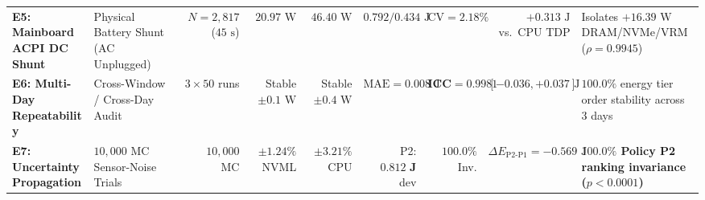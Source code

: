\documentclass[10pt,a4paper]{article}
\begin{document}
\begin{table}[htbp]
\begin{tabular}{@{}llrrrrrrl@{}}
\textbf{E5: Mainboard ACPI DC Shunt} & Physical Battery Shunt (AC Unplugged) & $N=2{,}817$ ($45\text{ s}$) & $20.97\text{ W}$ & $46.40\text{ W}$ & $0.792 / 0.434\text{ J}$ & $\text{CV}=2.18\%$ & $+0.313\text{ J}$ vs.\ CPU TDP & Isolates $+16.39\text{ W}$ DRAM/NVMe/VRM ($\rho=0.9945$) \\
\textbf{E6: Multi-Day Repeatability} & Cross-Window / Cross-Day Audit & $3\times 50$ runs & Stable $\pm 0.1\text{ W}$ & Stable $\pm 0.4\text{ W}$ & $\text{MAE}=0.008\text{ J}$ & $\mathbf{\text{ICC}=0.9981}$ & $[-0.036,+0.037]\text{ J}$ & $100.0\%$ energy tier order stability across 3 days \\
\textbf{E7: Uncertainty Propagation} & $10{,}000$ MC Sensor-Noise Trials & $10{,}000$ MC & $\pm 1.24\%$ NVML & $\pm 3.21\%$ CPU & P2: $\mathbf{0.812\text{ J}}$ dev & $\mathbf{100.0\%}$ Inv. & $\Delta E_{\text{P2-P1}}=-0.569\text{ J}$ & \textbf{$\mathbf{100.0\%}$ Policy P2 ranking invariance ($p<0.0001$)} \\
\bottomrule
\end{tabular}
\end{table}
\end{document}
